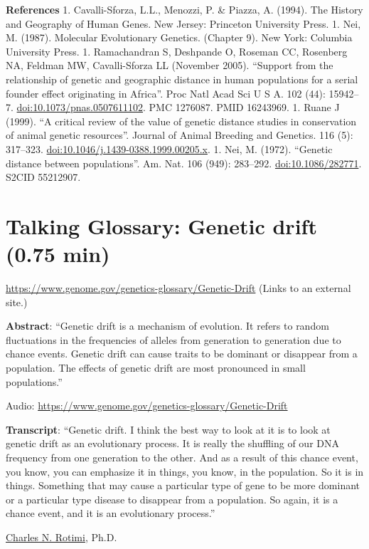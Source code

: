 \documentclass[
]{book}
\begin{document}
\textbf{References}
1. Cavalli-Sforza, L.L., Menozzi, P. \& Piazza, A. (1994). The History and Geography of Human Genes. New Jersey: Princeton University Press.
1. Nei, M. (1987). Molecular Evolutionary Genetics. (Chapter 9). New York: Columbia University Press.
1. Ramachandran S, Deshpande O, Roseman CC, Rosenberg NA, Feldman MW, Cavalli-Sforza LL (November 2005). ``Support from the relationship of genetic and geographic distance in human populations for a serial founder effect originating in Africa''. Proc Natl Acad Sci U S A. 102 (44): 15942--7. \url{doi:10.1073/pnas.0507611102}. PMC 1276087. PMID 16243969.
1. Ruane J (1999). ``A critical review of the value of genetic distance studies in conservation of animal genetic resources''. Journal of Animal Breeding and Genetics. 116 (5): 317--323. \url{doi:10.1046/j.1439-0388.1999.00205.x}.
1. Nei, M. (1972). ``Genetic distance between populations''. Am. Nat. 106 (949): 283--292. \url{doi:10.1086/282771}. S2CID 55212907.

\hypertarget{talking-glossary-genetic-drift-0.75-min}{%
\section{Talking Glossary: Genetic drift (0.75 min)}\label{talking-glossary-genetic-drift-0.75-min}}

\url{https://www.genome.gov/genetics-glossary/Genetic-Drift} (Links to an external site.)

\textbf{Abstract}: ``Genetic drift is a mechanism of evolution. It refers to random fluctuations in the frequencies of alleles from generation to generation due to chance events. Genetic drift can cause traits to be dominant or disappear from a population. The effects of genetic drift are most pronounced in small populations.''

Audio: \url{https://www.genome.gov/genetics-glossary/Genetic-Drift}

\textbf{Transcript}: ``Genetic drift. I think the best way to look at it is to look at genetic drift as an evolutionary process. It is really the shuffling of our DNA frequency from one generation to the other. And as a result of this chance event, you know, you can emphasize it in things, you know, in the population. So it is in things. Something that may cause a particular type of gene to be more dominant or a particular type disease to disappear from a population. So again, it is a chance event, and it is an evolutionary process.''

\href{https://www.genome.gov/staff/Charles-N-Rotimi-PhD}{Charles N. Rotimi}, Ph.D.
\end{document}
